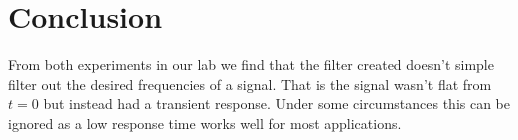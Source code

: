 \documentclass[main.tex]{subfile}
\begin{document}
\section{Conclusion} 
\label{sec:conclusion}

From both experiments in our lab we find that the filter created doesn't simple
filter out the desired frequencies of a signal. That is the signal wasn't flat
from $t = 0$ but instead had a transient response. Under some circumstances this
can be ignored as a low response time works well for most applications.

\end{document}
